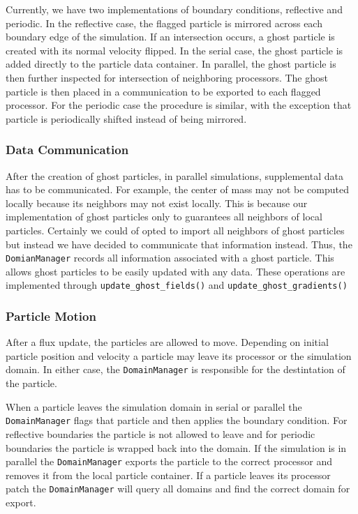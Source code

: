 Currently, we have two implementations of boundary conditions, reflective and periodic.
In the reflective case, the flagged particle is mirrored across each boundary edge of the
simulation. If an intersection occurs, a ghost particle is created with its normal velocity flipped.
In the serial case, the ghost particle is added directly to the particle data container. In parallel, the 
ghost particle is then further inspected for intersection of neighboring processors. The ghost particle
is then placed in a communication to be exported to each flagged processor. For the periodic case
the procedure is similar, with the exception that particle is periodically shifted
instead of being mirrored.

\subsubsection{Data Communication}
After the creation of ghost particles, in parallel simulations, supplemental data has to be communicated. 
For example, the center of mass may not be computed locally because its neighbors may not exist locally.
This is because our implementation of ghost particles only to guarantees all neighbors of local
particles. Certainly we could of opted to import all neighbors of ghost particles but instead we have 
decided to communicate that information instead. Thus, the \lstinline{DomianManager} records all information
associated with a ghost particle. This allows ghost particles to be easily updated with any data. These
operations are implemented through \lstinline{update_ghost_fields()} and 
\lstinline{update_ghost_gradients()}

\subsubsection{Particle Motion}
After a flux update, the particles are allowed to move. Depending on initial particle position and
velocity a particle may leave its processor or the simulation domain. In either case, the 
\lstinline{DomainManager} is responsible for the destintation of the particle.

When a particle leaves the simulation domain in serial or parallel the \lstinline{DomainManager}
flags that particle and then applies the boundary condition. For reflective boundaries the particle is not
allowed to leave and for periodic boundaries the particle is wrapped back into the domain. If the simulation
is in parallel the \lstinline{DomainManager} exports the particle to the correct processor and removes
it from the local particle container. If a particle leaves its processor patch the \lstinline{DomainManager}
will query all domains and find the correct domain for export.

